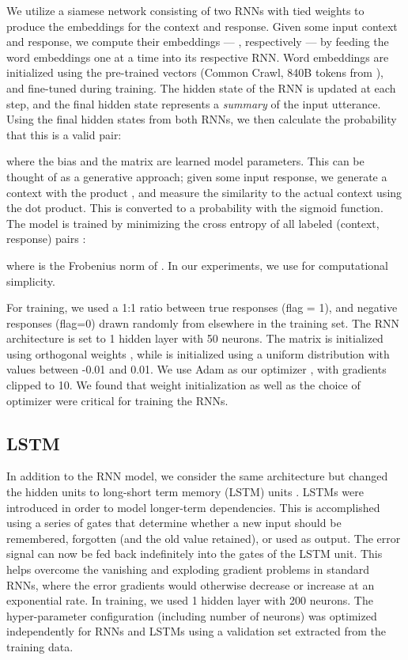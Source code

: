 \documentclass[11pt,a4paper]{article}
\begin{document}
We utilize a siamese network consisting of two RNNs with tied weights to produce the embeddings for the context and response. Given some input context and response, we compute their embeddings --- , respectively --- by feeding the word embeddings one at a time into its respective RNN. Word embeddings are initialized using the pre-trained vectors (Common Crawl, 840B tokens from \cite{Pennington2014}), and fine-tuned during training. The hidden state of the RNN is updated at each step, and the final hidden state represents a \emph{summary} of the input utterance. Using the final hidden states from both RNNs, we then calculate the probability that this is a valid pair:

where the bias  and the matrix  are learned model parameters. This can be thought of as a generative approach; given some input response, we generate a context with the product , and measure the similarity to the actual context using the dot product. This is converted to a probability with the sigmoid function. The model is trained by minimizing the cross entropy of all labeled (context, response) pairs \cite{yu2014deep}:

where  is the Frobenius norm of . In our experiments, we use  for computational simplicity.

For training, we used a 1:1 ratio between true responses (flag = 1), and negative responses (flag=0) drawn randomly from elsewhere in the training set. The RNN architecture is set to 1 hidden layer with 50 neurons. The  matrix is initialized using orthogonal weights \cite{saxe2013exact}, while  is initialized using a uniform distribution with values between -0.01 and 0.01. We use Adam as our optimizer \cite{DBLP:journals/corr/KingmaB14}, with gradients clipped to 10. We found that weight initialization as well as the choice of optimizer were critical for training the RNNs.



\subsection{LSTM}

In addition to the RNN model, we consider the same architecture but changed the hidden units to long-short term memory (LSTM) units \cite{hochreiter1997long}. LSTMs were introduced in order to model longer-term dependencies. This is accomplished using a series of gates that determine whether a new input should be remembered, forgotten (and the old value retained), or used as output. The error signal can now be fed back indefinitely into the gates of the LSTM unit. This helps overcome the vanishing and exploding gradient problems in standard RNNs, where the error gradients would otherwise decrease or increase at an exponential rate. In training, we used 1 hidden layer with 200 neurons.  The hyper-parameter configuration (including number of neurons) was optimized independently for RNNs and LSTMs using a validation set extracted from the training data.
\end{document}
